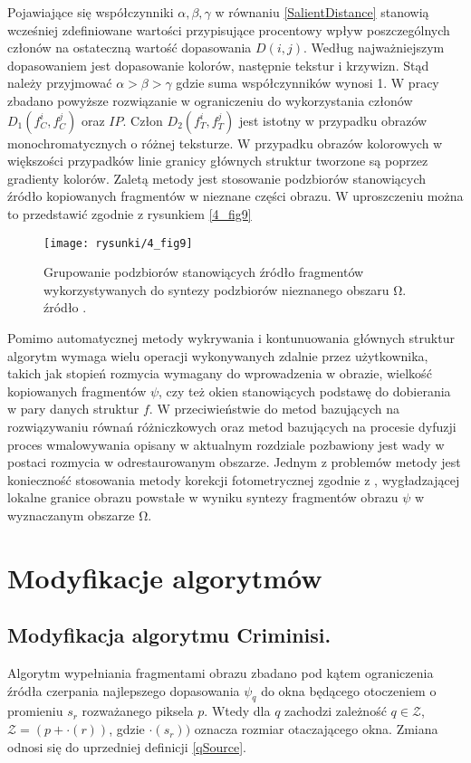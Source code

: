 \documentclass[12pt, twoside, openany]{report}
\theoremstyle{definition}
\begin{document}
Pojawiające się współczynniki $\alpha ,\beta ,\gamma $ w równaniu \eqref{SalientDistance} stanowią wcześniej zdefiniowane wartości przypisujące procentowy wpływ poszczególnych członów na ostateczną wartość dopasowania $D(i,j)$. Według \cite{SalientStrucTexProp} najważniejszym dopasowaniem jest dopasowanie kolorów, następnie tekstur i krzywizn. Stąd należy przyjmować $\alpha >\beta >\gamma $ gdzie suma współczynników wynosi 1. W pracy zbadano powyższe rozwiązanie w ograniczeniu do wykorzystania członów $D_1\left(f^i_C,f^j_C\right)$ oraz $IP$. Człon $D_2\left(f^i_T,f^j_T\right)$ jest istotny w przypadku obrazów monochromatycznych o różnej teksturze. W przypadku obrazów kolorowych w większości przypadków linie granicy głównych struktur tworzone są poprzez gradienty kolorów. Zaletą metody jest stosowanie podzbiorów stanowiących źródło kopiowanych fragmentów w nieznane części obrazu. W uproszczeniu można to przedstawić zgodnie z rysunkiem \autoref{4_fig9}
\begin{figure}[!h]
	\centering
	\texttt{[image: rysunki/4\_fig9]}
	\caption{Grupowanie podzbiorów stanowiących źródło fragmentów wykorzystywanych do syntezy podzbiorów nieznanego obszaru $\boldsymbol{\mathrm{\Omega }}$. źródło \cite{StructurePropagationManual}.}
\label{4_fig9}
\end{figure}
Pomimo automatycznej metody wykrywania i kontunuowania głównych struktur algorytm wymaga wielu operacji wykonywanych zdalnie przez użytkownika, takich jak stopień rozmycia wymagany do wprowadzenia w obrazie, wielkość kopiowanych fragmentów $\psi $, czy też okien stanowiących podstawę do dobierania w pary danych struktur $f$. W przeciwieństwie do metod bazujących na rozwiązywaniu równań różniczkowych oraz metod bazujących na procesie dyfuzji proces wmalowywania opisany w aktualnym rozdziale pozbawiony jest wady w postaci rozmycia w odrestaurowanym obszarze. Jednym z problemów metody jest konieczność stosowania metody korekcji fotometrycznej zgodnie z \cite{StructurePropagationManual}, wygładzającej lokalne granice obrazu powstałe w wyniku syntezy fragmentów obrazu $\psi $ w wyznaczanym obszarze $\mathrm{\Omega }$.
\chapter{Modyfikacje algorytmów}
\section{Modyfikacja algorytmu Criminisi.}
\label{ssec:crimMod}
Algorytm wypełniania fragmentami obrazu zbadano pod kątem ograniczenia źródła czerpania najlepszego dopasowania $\psi_{q}$ do okna będącego otoczeniem o promieniu $s_r$ rozważanego piksela $p$. Wtedy dla $q$ zachodzi zależność $q \in \mathcal{Z}$, $\mathcal{Z} = (p + \cdot(r))$, gdzie $\cdot(s_r))$ oznacza rozmiar otaczającego okna. Zmiana odnosi się do uprzedniej definicji \eqref{qSource}.
\end{document}
